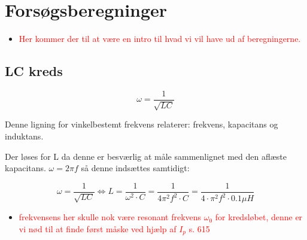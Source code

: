 \chapter{Forsøgsberegninger}

\begin{itemize}
\item \textcolor{red}{Her kommer der til at være en intro til hvad vi vil have ud af beregningerne.}
\end{itemize}

\section{LC kreds}

\begin{equation} \label{angfreq}
	\omega = \frac{1}{\sqrt{LC}}
\end{equation}

Denne ligning for vinkelbestemt frekvens relaterer: frekvens, kapacitans og induktans.

Der løses for L da denne er besværlig at måle sammenlignet med den aflæste kapacitans. $\omega = 2\pi f$ så denne indsættes samtidigt:

\begin{equation}
	\omega = \frac{1}{\sqrt{LC}} \Leftrightarrow L = \frac{1}{\omega^2 \cdot C} = \frac{1}{4\pi^2 f^2 \cdot C} = \frac{1}{4\cdot \pi^2 f^2\cdot 0.1\mu H}
\end{equation}

\begin{itemize}
\item \textcolor{red}{frekvensens her skulle nok være resonant frekvens $\omega_0$ for kredsløbet, denne er vi nød til at finde først måske ved hjælp af $I_p$ s. 615}
\end{itemize}